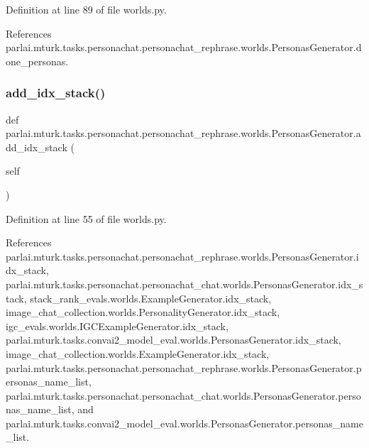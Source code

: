 Definition at line 89 of file worlds.\+py.



References parlai.\+mturk.\+tasks.\+personachat.\+personachat\+\_\+rephrase.\+worlds.\+Personas\+Generator.\+done\+\_\+personas.

\mbox{\label{classparlai_1_1mturk_1_1tasks_1_1personachat_1_1personachat__rephrase_1_1worlds_1_1PersonasGenerator_af1fe911f6615919580c9beb7f1ce04c0}} 
\subsubsection{\texorpdfstring{add\+\_\+idx\+\_\+stack()}{add\_idx\_stack()}}
{\footnotesize\ttfamily def parlai.\+mturk.\+tasks.\+personachat.\+personachat\+\_\+rephrase.\+worlds.\+Personas\+Generator.\+add\+\_\+idx\+\_\+stack (\begin{DoxyParamCaption}\item[{}]{self }\end{DoxyParamCaption})}



Definition at line 55 of file worlds.\+py.



References parlai.\+mturk.\+tasks.\+personachat.\+personachat\+\_\+rephrase.\+worlds.\+Personas\+Generator.\+idx\+\_\+stack, parlai.\+mturk.\+tasks.\+personachat.\+personachat\+\_\+chat.\+worlds.\+Personas\+Generator.\+idx\+\_\+stack, stack\+\_\+rank\+\_\+evals.\+worlds.\+Example\+Generator.\+idx\+\_\+stack, image\+\_\+chat\+\_\+collection.\+worlds.\+Personality\+Generator.\+idx\+\_\+stack, igc\+\_\+evals.\+worlds.\+I\+G\+C\+Example\+Generator.\+idx\+\_\+stack, parlai.\+mturk.\+tasks.\+convai2\+\_\+model\+\_\+eval.\+worlds.\+Personas\+Generator.\+idx\+\_\+stack, image\+\_\+chat\+\_\+collection.\+worlds.\+Example\+Generator.\+idx\+\_\+stack, parlai.\+mturk.\+tasks.\+personachat.\+personachat\+\_\+rephrase.\+worlds.\+Personas\+Generator.\+personas\+\_\+name\+\_\+list, parlai.\+mturk.\+tasks.\+personachat.\+personachat\+\_\+chat.\+worlds.\+Personas\+Generator.\+personas\+\_\+name\+\_\+list, and parlai.\+mturk.\+tasks.\+convai2\+\_\+model\+\_\+eval.\+worlds.\+Personas\+Generator.\+personas\+\_\+name\+\_\+list.



